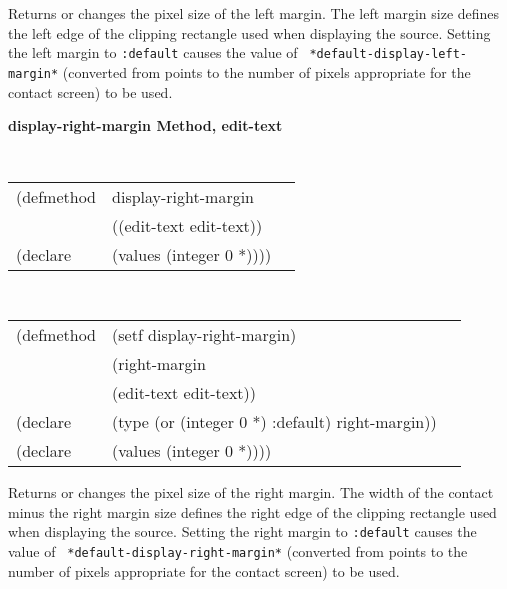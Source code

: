 \begin{flushright} \parbox[t]{6.125in}{
Returns or changes the pixel size of the
left margin.  The left margin size defines
the left edge of the clipping rectangle used when displaying the source.
Setting the left margin to {\tt :default} causes the value of {\tt
*default-display-left-margin*} (converted from points to the number of pixels
appropriate for the contact screen) to be used.
}
\end{flushright}




{\samepage  
{\large {\bf display-right-margin \hfill Method, edit-text}}
\begin{flushright} \parbox[t]{6.125in}{
\tt
\begin{tabular}{lll}
\raggedright
(defmethod & display-right-margin & \\
& ((edit-text  edit-text)) \\
(declare & (values (integer 0 *))))
\end{tabular}
\rm

}\end{flushright}}

\begin{flushright} \parbox[t]{6.125in}{
\tt
\begin{tabular}{lll}
\raggedright
(defmethod & (setf display-right-margin) & \\
         & (right-margin \\
         & (edit-text  edit-text)) \\
(declare &(type (or (integer 0 *) :default)  right-margin))\\
(declare & (values (integer 0 *))))
\end{tabular}
\rm}
\end{flushright}

\begin{flushright} \parbox[t]{6.125in}{
Returns or changes the pixel size of the
right margin.  The width of the contact minus the right margin size defines
the right edge of the clipping rectangle used when displaying the source.
Setting the right margin to {\tt :default} causes the value of {\tt
*default-display-right-margin*} (converted from points to the number of pixels
appropriate for the contact screen) to be used.
}
\end{flushright}


